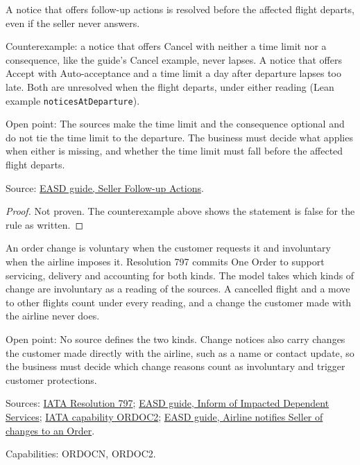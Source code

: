 \begin{theorem}
  \label{thm:airline-change-resolved-before-departure}
  A notice that offers follow-up actions is resolved before the affected
  flight departs, even if the seller never answers.

  Counterexample: a notice that offers Cancel with neither a time limit nor
  a consequence, like the guide's Cancel example, never lapses.  A notice
  that offers Accept with Auto-acceptance and a time limit a day after
  departure lapses too late.  Both are unresolved when the flight departs,
  under either reading (Lean example \texttt{noticesAtDeparture}).

  Open point: The sources make the time limit and the consequence optional
  and do not tie the time limit to the departure.  The business must decide
  what applies when either is missing, and whether the time limit must fall
  before the affected flight departs.

  Source: \href{https://standards.atlassian.net/wiki/spaces/EASD/pages/574849094}{EASD guide, Seller Follow-up Actions}.
\end{theorem}
\begin{proof}
  Not proven.  The counterexample above shows the statement is false for the
  rule as written.
\end{proof}

\begin{definition}
  \label{def:airline-change-involuntary-change}
  An order change is voluntary when the customer requests it and involuntary
  when the airline imposes it. Resolution 797 commits One Order to support
  servicing, delivery and accounting for both kinds.  The model takes which
  kinds of change are involuntary as a reading of the sources.  A cancelled
  flight and a move to other flights count under every reading, and a change
  the customer made with the airline never does.

  Open point: No source defines the two kinds. Change notices also carry
  changes the customer made directly with the airline, such as a name or
  contact update, so the business must decide which change reasons count as
  involuntary and trigger customer protections.

  Sources: \href{https://www.iata.org/contentassets/72cbd60393ff42b5975d90ce9e049a7d/oneorder-resolution-797.pdf}{IATA Resolution 797};
  \href{https://standards.atlassian.net/wiki/spaces/EASD/pages/672825400}{EASD guide, Inform of Impacted Dependent Services};
  \href{https://retailing.iata.org/armi/docs/ORDOC2/}{IATA capability ORDOC2};
  \href{https://standards.atlassian.net/wiki/spaces/EASD/pages/815202352}{EASD guide, Airline notifies Seller of changes to an Order}.

  Capabilities: ORDOCN, ORDOC2.
\end{definition}

